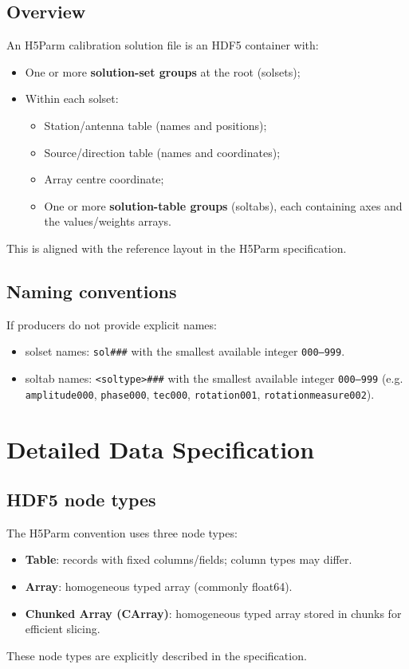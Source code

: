 \documentclass[a4paper,10pt,bibtotoc]{scrartcl}
\begin{document}
\subsection*{Overview}
An H5Parm calibration solution file is an HDF5 container with:
\begin{itemize}
  \item One or more \textbf{solution-set groups} at the root (solsets);
  \item Within each solset:
  \begin{itemize}
    \item Station/antenna table (names and positions);
    \item Source/direction table (names and coordinates);
    \item Array centre coordinate;
    \item One or more \textbf{solution-table groups} (soltabs), each containing axes and the
          values/weights arrays.
  \end{itemize}
\end{itemize}
This is aligned with the reference layout in the H5Parm specification. 

\subsection*{Naming conventions}
If producers do not provide explicit names:
\begin{itemize}
  \item solset names: \texttt{sol\#\#\#} with the smallest available integer \texttt{000--999}. 
  \item soltab names: \texttt{<soltype>\#\#\#} with the smallest available integer \texttt{000--999}
        (e.g. \texttt{amplitude000}, \texttt{phase000}, \texttt{tec000}, \texttt{rotation001}, \texttt{rotationmeasure002}). 
\end{itemize}



\section{Detailed Data Specification}

\subsection{HDF5 node types}
The H5Parm convention uses three node types:
\begin{itemize}
  \item \textbf{Table}: records with fixed columns/fields; column types may differ.
  \item \textbf{Array}: homogeneous typed array (commonly float64).
  \item \textbf{Chunked Array (CArray)}: homogeneous typed array stored in chunks for efficient slicing.
\end{itemize}
These node types are explicitly described in the specification. 
\end{document}
